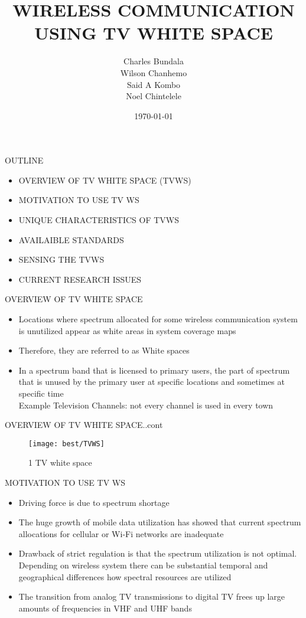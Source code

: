 \documentclass[]{beamer}
\title{WIRELESS COMMUNICATION USING TV WHITE SPACE}    %
\author{Charles Bundala\\Wilson Chanhemo\\Said A Kombo\\ Noel Chintelele}                 %
\institute{University of Dodoma}      %
\date{\today}
\begin{document}
\begin{frame}
 \titlepage
\end{frame}     %

\begin{frame}{\centering OUTLINE}
  \begin{itemize}
  \item OVERVIEW OF TV WHITE SPACE (TVWS)
  \item	MOTIVATION TO USE TV WS
  \item UNIQUE CHARACTERISTICS OF TVWS
  \item AVAILAIBLE STANDARDS
  \item SENSING THE TVWS
  \item CURRENT RESEARCH ISSUES
  \end{itemize}
\end{frame}
\begin{frame}{OVERVIEW OF TV WHITE SPACE}
	\begin{itemize}
		\item {Locations where spectrum allocated for some wireless communication system is unutilized appear as white areas in system coverage maps}
		\item {Therefore, they are referred to as White spaces }
		\item {In a spectrum band that is licensed to primary users, the part of spectrum that is unused by the primary user at specific locations and sometimes at specific time\\
			Example Television Channels: not every channel is used in every town}
	\end{itemize}
\end{frame}
\begin{frame}{OVERVIEW OF TV WHITE SPACE..cont}
	\begin{figure}
\centering
\texttt{[image: best/TVWS]}
\caption{1 TV white space}
\label{fig:TVWS}
\end{figure}
\end{frame}
\begin{frame}{MOTIVATION TO USE TV WS}
	\begin{itemize}
		\item{Driving force is due to spectrum shortage}
		\item {The huge growth of mobile data utilization has showed that current spectrum allocations for cellular or Wi-Fi networks are inadequate}
		\item {Drawback of strict regulation is that the spectrum utilization is not optimal. Depending on wireless system there can be substantial temporal and geographical differences how spectral resources are utilized}
		\item{The transition from analog TV transmissions to digital TV frees up large amounts of frequencies in VHF and UHF bands}
	\end{itemize}
\end{frame}
\end{document}
